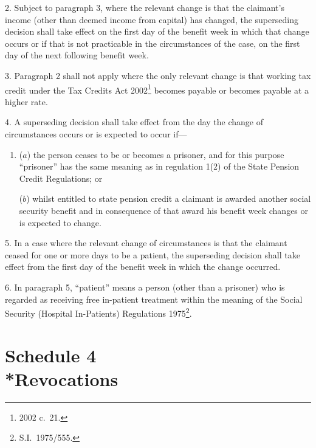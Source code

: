 \documentclass[12pt,a4paper]{article}
\begin{document}
\medskip

2.  Subject to paragraph 3, where the relevant change is that the claimant’s income (other than deemed income from capital) has changed, the superseding decision shall take effect on the first day of the benefit week in which that change occurs or if that is not practicable in the circumstances of the case, on the first day of the next following benefit week.

\medskip

3.  Paragraph 2 shall not apply where the only relevant change is that working tax credit under the Tax Credits Act 2002\footnote{2002 c.\ 21.} becomes payable or becomes payable at a higher rate.

\medskip

4.  A superseding decision shall take effect from the day the change of circumstances occurs or is expected to occur if—
\begin{enumerate}\item[]
($a$) the person ceases to be or becomes a prisoner, and for this purpose “prisoner” has the same meaning as in regulation 1(2) of the State Pension Credit Regulations; or

($b$) whilst entitled to state pension credit a claimant is awarded another social security benefit and in consequence of that award his benefit week changes or is expected to change.
\end{enumerate}

\medskip

5.  In a case where the relevant change of circumstances is that the claimant ceased for one or more days to be a patient, the superseding decision shall take effect from the first day of the benefit week in which the change occurred.

\medskip

6.  In paragraph 5, “patient” means a person (other than a prisoner) who is regarded as receiving free in-patient treatment within the meaning of the Social Security (Hospital In-Patients) Regulations 1975\footnote{S.I.\ 1975/555.}.

\part[Schedule 4 --- Revocations]{Schedule 4\\*Revocations}

\renewcommand\parthead{--- Schedule 4}
\end{document}

